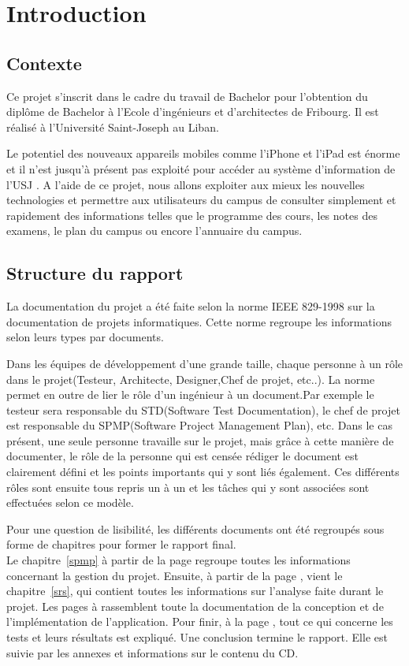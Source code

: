 \documentclass[12pt,a4paper,twoside]{report}
\begin{document}
\cleardoublepage
\chapter{Introduction}
\cleardoublepage
\section{Contexte}
Ce projet s'inscrit dans le cadre du travail de Bachelor pour l'obtention du diplôme de Bachelor à l'Ecole d'ingénieurs et d'architectes de Fribourg. Il est réalisé à l'Université Saint-Joseph au Liban. 

Le potentiel des nouveaux appareils mobiles comme l'iPhone et l'iPad est énorme et il n'est jusqu'à présent pas exploité pour accéder au système d'information de l'\gls{USJ} . A l'aide de ce projet, nous allons exploiter aux mieux les nouvelles technologies et permettre aux utilisateurs du campus de consulter simplement et rapidement des informations telles que le programme des cours, les notes des examens, le plan du campus ou encore l'annuaire du campus.

\section{Structure du rapport}
La documentation du projet a été faite selon la norme IEEE 829-1998 sur la documentation de projets informatiques. Cette norme regroupe les informations selon leurs types par documents. 

Dans les équipes de développement d'une grande taille, chaque personne à un rôle dans le projet(Testeur, Architecte, Designer,Chef de projet, etc..). La norme permet en outre de lier le rôle d'un ingénieur à un document.Par exemple le testeur sera responsable du STD(Software Test Documentation), le chef de projet est responsable du SPMP(Software Project Management Plan), etc. Dans le cas présent, une seule personne travaille sur le projet, mais grâce à cette manière de documenter, le rôle de la personne qui est censée rédiger le document est clairement défini et les points importants qui y sont liés également. Ces différents rôles sont ensuite tous repris un à un et les tâches qui y sont associées sont effectuées selon ce modèle.

Pour une question de lisibilité, les différents documents ont été regroupés sous forme de chapitres pour former le rapport final.\\
Le chapitre~\ref{spmp} à partir de la page \pageref{spmp} regroupe toutes les informations concernant la gestion du projet. Ensuite, à partir de la page \pageref{srs}, vient le chapitre~\ref{srs}, qui contient toutes les informations sur l'analyse faite durant le projet. Les pages \pageref{sdd} à \pageref{std} rassemblent toute la documentation de la conception et de l'implémentation de l'application. Pour finir, à la page \pageref{std}, tout ce qui concerne les tests et leurs résultats est expliqué. 
Une conclusion termine le rapport. Elle est suivie par les annexes et informations sur le contenu du CD.
\end{document}
